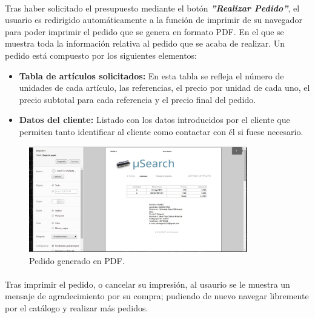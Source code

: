 \paragraph{}Tras haber solicitado el presupuesto mediante el botón \textit{\textbf{''Realizar Pedido''}}, el usuario es redirigido automáticamente a la función de imprimir de su navegador para poder imprimir el pedido que se genera en formato PDF. En el que se muestra toda la información relativa al pedido que se acaba de realizar. Un pedido está compuesto por los siguientes elementos:

\begin{itemize}
	\item \textbf{Tabla de artículos solicitados:} En esta tabla se refleja el número de unidades de cada artículo, las referencias, el precio por unidad de cada uno, el precio subtotal para cada referencia y el precio final del pedido.
	
	\item \textbf{Datos del cliente:} Listado con los datos introducidos por el cliente que permiten tanto identificar al cliente como contactar con él si fuese necesario.
\end{itemize}

\begin{figure}[h!]
	\centering
	\includegraphics[width=0.85\textwidth]{img/pedido}
	\caption{Pedido generado en PDF.}
	\label{fig:pedido}
\end{figure}

\paragraph{} Tras imprimir el pedido, o cancelar su impresión, al usaurio se le muestra un mensaje de agradecimiento por su compra; pudiendo de nuevo navegar libremente por el catálogo y realizar más pedidos.